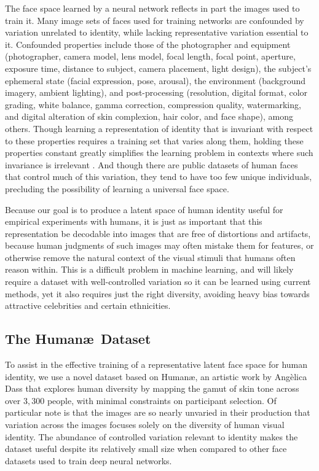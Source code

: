 \documentclass[10pt,letterpaper]{article}
\begin{document}
The face space learned by a neural network reflects in part the images used to train it. Many image sets of faces used for training networks are confounded by variation unrelated to identity, while lacking representative variation essential to it. Confounded properties include those of the photographer and equipment (photographer, camera model, lens model, focal length, focal point, aperture, exposure time, distance to subject, camera placement, light design), the subject's ephemeral state (facial expression, pose, arousal), the environment (background imagery, ambient lighting), and post-processing (resolution, digital format, color grading, white balance, gamma correction, compression quality, watermarking, and digital alteration of skin complexion, hair color, and face shape), among others. Though learning a representation of identity that is invariant with respect to these properties requires a training set that varies along them, holding these properties constant greatly simplifies the learning problem in contexts where such invariance is irrelevant \citep{zhang2009face}. And though there are public datasets of human faces that control much of this variation, they tend to have too few unique individuals, precluding the possibility of learning a universal face space.

Because our goal is to produce a latent space of human identity useful for empirical experiments with humans, it is just as important that this representation be decodable into images that are free of distortions and artifacts, because human judgments of such images may often mistake them for features, or otherwise remove the natural context of the visual stimuli that humans often reason within. This is a difficult problem in machine learning, and will likely require a dataset with well-controlled variation so it can be learned using current methods, yet it also requires just the right diversity, avoiding heavy bias towards attractive celebrities and certain ethnicities.

\subsection{The Human\ae \, Dataset}

To assist in the effective training of a representative latent face space for human identity, we use a novel dataset based on Human{\ae}, an artistic work by Ang\`elica Dass that explores human diversity by mapping the gamut of skin tone across over $3,300$ people, with minimal constraints on participant selection. Of particular note is that the images are so nearly unvaried in their production that variation across the images focuses solely on the diversity of human visual identity. The abundance of controlled variation relevant to identity makes the dataset useful despite its relatively small size when compared to other face datasets used to train deep neural networks.
\end{document}
